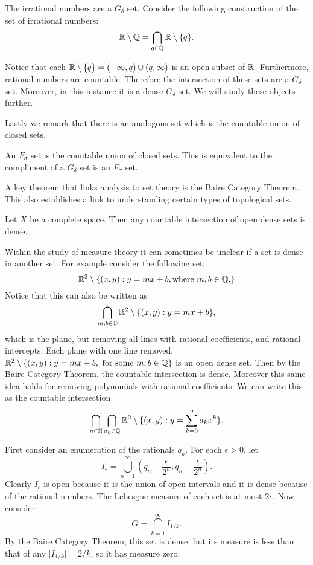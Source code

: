 \begin{example}
    The irrational numbers are a $G_\delta$ set.  Consider the following construction of the set of irrational numbers:
    $$\mathbb{R} \setminus \mathbb{Q} = \bigcap_{q \in \mathbb{Q}}\mathbb{R} \setminus \{q\}.$$
\end{example}
Notice that each $\mathbb{R}\setminus \{q\} = (-\infty, q) \cup (q, \infty)$ is an open subset of $\mathbb{R}$.  Furthermore, rational numbers are countable.  Therefore the intersection of these sets are a $G_\delta$ set.  Moreover, in this instance it is a dense $G_\delta$ set.  We will study these objects further.  

Lastly we remark that there is an analogous set which is the countable union of closed sets.
\begin{definition}
    An $F_\sigma$ set is the countable union of closed sets.  This is equivalent to the compliment of a $G_\delta$ set is an $F_\sigma$ set.    
\end{definition}

A key theorem that links analysis to set theory is the Baire Category Theorem.  This also establishes a link to understanding certain types of topological sets.  
\begin{theorem}
    Let $X$ be a complete space.  Then any countable intersection of open dense sets is dense.  
\end{theorem}

Within the study of measure theory it can sometimes be unclear if a set is dense in another set.  For example consider the following set: 
$$\mathbb{R}^2 \setminus \{(x,y): y=mx + b, \text{where $m, b \in \mathbb{Q}$.}\}$$
Notice that this can also be written as $$\bigcap_{m,b \in \mathbb{Q}} \mathbb{R}^2 \setminus \{(x,y): y=mx+b\}, $$ which is the plane, but removing all lines with rational coefficients, and rational intercepts.  Each plane with one line removed, $\mathbb{R}^2 \setminus \{(x,y) : y=mx+b, \text{ for some } m,b \in \mathbb{Q}\}$ is an open dense set.  Then by the Baire Category Theorem, the countable intersection is dense.  Moreover this same idea holds for removing polynomials with rational coefficients.  We can write this as the countable intersection 
$$\bigcap_{n\in \mathbb{N}}\bigcap_{a_k \in \mathbb{Q}}\mathbb{R}^2 \setminus \{(x,y): y = \sum_{k=0}^n a_kx^k\}.$$


\begin{example}
     First consider an enumeration of the rationals $q_n.$  For each $\epsilon > 0$, let $$I_\epsilon = \bigcup_{n=1}^\infty (q_n - \frac{\epsilon}{2^n}, q_n + \frac{\epsilon}{2^n}).$$  Clearly $I_\epsilon$ is open because it is the union of open intervals and it is dense because of the rational numbers.  The Lebesgue measure of each set is at most $2\epsilon$.  Now consider $$G = \bigcap_{k=1}^\infty I_{1/k}.$$  By the Baire Category Theorem, this set is dense, but its measure is less than that of any $\vert I_{1/k} \vert = 2/k $, so it has measure zero.
\end{example}

